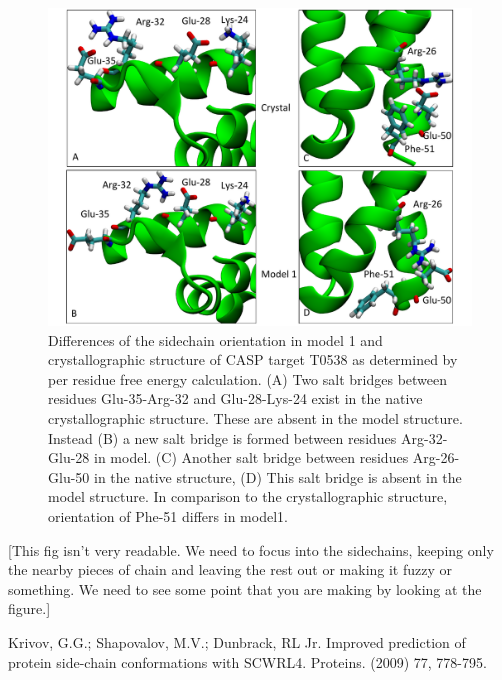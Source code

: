 \documentclass[12pt]{article}
\newcommand{\Ken}[1]{\color{red}#1\normalcolor}
\begin{document}
\begin{figure}
\begin{center}
\includegraphics[width=4.9 in,height=4.0 in]{Target_538_compare.pdf}
\end{center}
\caption{Differences of the sidechain orientation in model 1 and crystallographic structure of CASP target T0538 as determined 
by per residue free energy calculation.  
(A) Two salt bridges between residues Glu-35-Arg-32 and Glu-28-Lys-24 exist in the native crystallographic structure. These are
absent in the model structure. Instead
(B) a new salt bridge is formed between residues Arg-32-Glu-28 in model. (C) Another salt bridge between
residues  Arg-26-Glu-50 in the native structure, (D) This salt bridge is absent in the model structure. In comparison to the crystallographic 
structure, orientation of Phe-51 differs in model1.}
\label{fig:T0538compare}
\end{figure}

\Ken{[This fig isn't very readable.  We need to focus into the sidechains, keeping only the nearby pieces of chain and leaving the rest out or making it fuzzy or something.  We need to see some point that you are making by looking at the figure.]}

\begin{thebibliography}{99}

Krivov, G.G.; Shapovalov, M.V.; Dunbrack, RL Jr. Improved prediction of protein side-chain conformations with SCWRL4.
Proteins. (2009) 77, 778-795.

\end{thebibliography}

\end{document}
